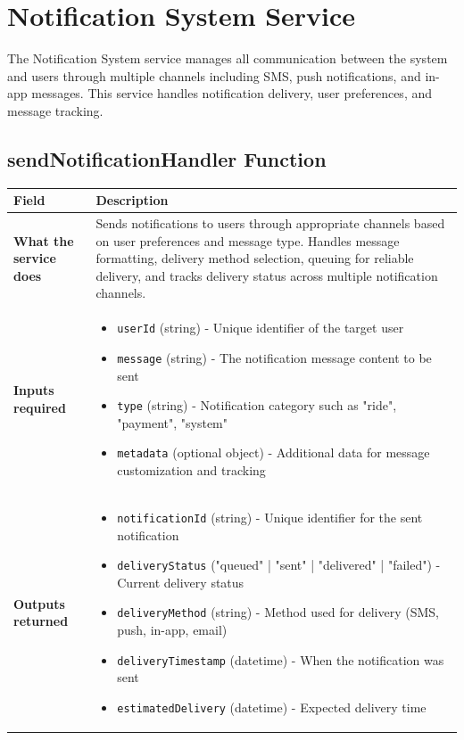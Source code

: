 \documentclass[11pt,a4paper]{article}
\begin{document}
\section{Notification System Service}

The Notification System service manages all communication between the system and users through multiple channels including SMS, push notifications, and in-app messages. This service handles notification delivery, user preferences, and message tracking.

\subsection{sendNotificationHandler Function}

\begin{longtable}{|p{3cm}|p{12cm}|}
\hline
\textbf{Field} & \textbf{Description} \\
\hline
\textbf{What the service does} & 
Sends notifications to users through appropriate channels based on user preferences and message type. Handles message formatting, delivery method selection, queuing for reliable delivery, and tracks delivery status across multiple notification channels. \\
\hline
\textbf{Inputs required} & 
\begin{itemize}[nosep]
\item \texttt{userId} (string) - Unique identifier of the target user
\item \texttt{message} (string) - The notification message content to be sent
\item \texttt{type} (string) - Notification category such as "ride", "payment", "system"
\item \texttt{metadata} (optional object) - Additional data for message customization and tracking
\end{itemize} \\
\hline
\textbf{Outputs returned} & 
\begin{itemize}[nosep]
\item \texttt{notificationId} (string) - Unique identifier for the sent notification
\item \texttt{deliveryStatus} ("queued" | "sent" | "delivered" | "failed") - Current delivery status
\item \texttt{deliveryMethod} (string) - Method used for delivery (SMS, push, in-app, email)
\item \texttt{deliveryTimestamp} (datetime) - When the notification was sent
\item \texttt{estimatedDelivery} (datetime) - Expected delivery time

\end{itemize}
\end{longtable}
\end{document}
